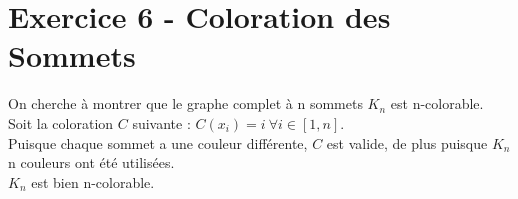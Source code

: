 
\section{Exercice 6 - Coloration des Sommets}\label{ex6}
On cherche \`a montrer que le graphe complet \`a n sommets $K_n$ est n-colorable.\\
Soit la coloration $C$ suivante :
$C(x_i) = i\ \forall i \in [1,n]$.\\
Puisque chaque sommet a une couleur diff\'erente, $C$ est valide, de plus puisque $K_n$
n couleurs ont \'et\'e utilis\'ees.\\
$K_n$ est bien n-colorable.

